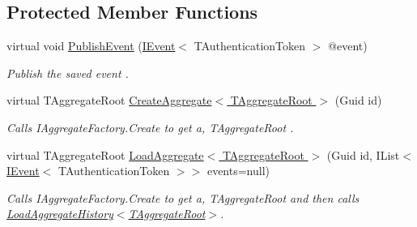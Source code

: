 \subsection*{Protected Member Functions}
\begin{DoxyCompactItemize}
\item 
virtual void \hyperlink{classCqrs_1_1Domain_1_1AggregateRepository_a3191ba3d6fa4f6b904128c4731262944_a3191ba3d6fa4f6b904128c4731262944}{Publish\+Event} (\hyperlink{interfaceCqrs_1_1Events_1_1IEvent}{I\+Event}$<$ T\+Authentication\+Token $>$ @event)
\begin{DoxyCompactList}\small\item\em Publish the saved {\itshape event} . \end{DoxyCompactList}\item 
virtual T\+Aggregate\+Root \hyperlink{classCqrs_1_1Domain_1_1AggregateRepository_a64d82c57bbe49a11bd5cf20c5b86ce19_a64d82c57bbe49a11bd5cf20c5b86ce19}{Create\+Aggregate$<$ T\+Aggregate\+Root $>$} (Guid id)
\begin{DoxyCompactList}\small\item\em Calls I\+Aggregate\+Factory.\+Create to get a, {\itshape T\+Aggregate\+Root} . \end{DoxyCompactList}\item 
virtual T\+Aggregate\+Root \hyperlink{classCqrs_1_1Domain_1_1AggregateRepository_a53bf020a5f2a0f697f361065b792cf61_a53bf020a5f2a0f697f361065b792cf61}{Load\+Aggregate$<$ T\+Aggregate\+Root $>$} (Guid id, I\+List$<$ \hyperlink{interfaceCqrs_1_1Events_1_1IEvent}{I\+Event}$<$ T\+Authentication\+Token $>$$>$ events=null)
\begin{DoxyCompactList}\small\item\em Calls I\+Aggregate\+Factory.\+Create to get a, {\itshape T\+Aggregate\+Root}  and then calls \hyperlink{classCqrs_1_1Domain_1_1AggregateRepository_af26efcb464ac989962a9ad138466e4d7_af26efcb464ac989962a9ad138466e4d7}{Load\+Aggregate\+History$<$\+T\+Aggregate\+Root$>$}. \end{DoxyCompactList}\end{DoxyCompactItemize}

